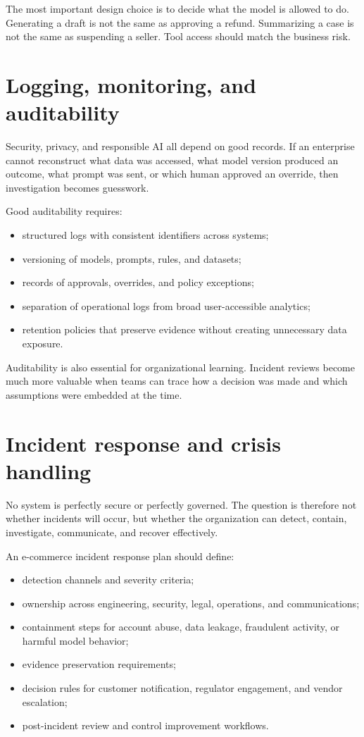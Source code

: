 The most important design choice is to decide what the model is allowed to do. Generating a draft is not the same as approving a refund. Summarizing a case is not the same as suspending a seller. Tool access should match the business risk.

\section{Logging, monitoring, and auditability}
Security, privacy, and responsible AI all depend on good records. If an enterprise cannot reconstruct what data was accessed, what model version produced an outcome, what prompt was sent, or which human approved an override, then investigation becomes guesswork.

Good auditability requires:
\begin{itemize}
  \item structured logs with consistent identifiers across systems;
  \item versioning of models, prompts, rules, and datasets;
  \item records of approvals, overrides, and policy exceptions;
  \item separation of operational logs from broad user-accessible analytics;
  \item retention policies that preserve evidence without creating unnecessary data exposure.
\end{itemize}

Auditability is also essential for organizational learning. Incident reviews become much more valuable when teams can trace how a decision was made and which assumptions were embedded at the time.

\section{Incident response and crisis handling}
No system is perfectly secure or perfectly governed. The question is therefore not whether incidents will occur, but whether the organization can detect, contain, investigate, communicate, and recover effectively.

An e-commerce incident response plan should define:
\begin{itemize}
  \item detection channels and severity criteria;
  \item ownership across engineering, security, legal, operations, and communications;
  \item containment steps for account abuse, data leakage, fraudulent activity, or harmful model behavior;
  \item evidence preservation requirements;
  \item decision rules for customer notification, regulator engagement, and vendor escalation;
  \item post-incident review and control improvement workflows.
\end{itemize}


